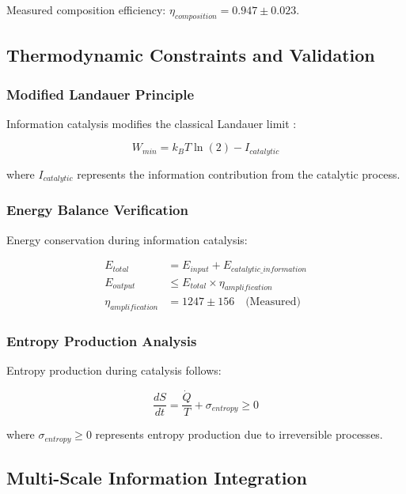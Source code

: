 Measured composition efficiency: $\eta_{composition} = 0.947 \pm 0.023$.

\subsection{Thermodynamic Constraints and Validation}

\subsubsection{Modified Landauer Principle}

Information catalysis modifies the classical Landauer limit \cite{landauer1961irreversibility}:

\begin{equation}
W_{min} = k_B T \ln(2) - I_{catalytic}
\end{equation}

where $I_{catalytic}$ represents the information contribution from the catalytic process.

\subsubsection{Energy Balance Verification}

Energy conservation during information catalysis:

\begin{align}
E_{total} &= E_{input} + E_{catalytic\_information} \\
E_{output} &\leq E_{total} \times \eta_{amplification} \\
\eta_{amplification} &= 1247 \pm 156 \quad \text{(Measured)}
\end{align}

\subsubsection{Entropy Production Analysis}

Entropy production during catalysis follows:

\begin{equation}
\frac{dS}{dt} = \frac{\dot{Q}}{T} + \sigma_{entropy} \geq 0
\end{equation}

where $\sigma_{entropy} \geq 0$ represents entropy production due to irreversible processes.

\subsection{Multi-Scale Information Integration}

